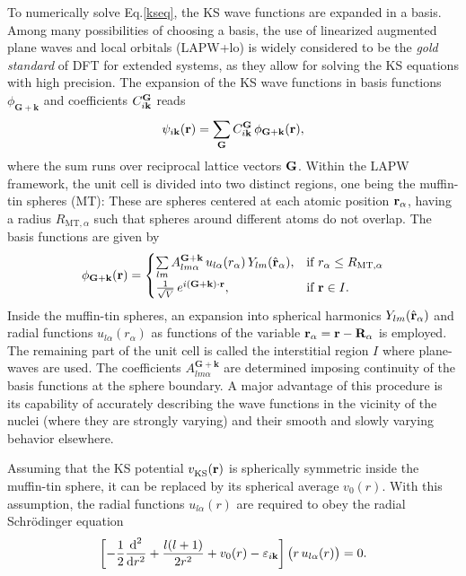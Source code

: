 To numerically solve Eq.\;\eqref{kseq}, the KS wave functions are expanded in a basis. Among many possibilities of choosing a basis, the use of linearized augmented plane waves and local orbitals (LAPW+lo) is widely considered to be the \textit{gold standard} of DFT for extended systems, as they allow for solving the KS equations  with high precision\cite{exciting}.  The expansion of the KS wave functions in basis functions $\phi_\mathbf{G+k}$ and coefficients $C^{\mathbf{G}}_{i\mathbf{k}}$  reads
 \begin{align}
    \psi_{i\mathbf{k}}(\mathbf{r}) = \sum_{\mathbf{G}} C^{\mathbf{G}}_{i\mathbf{k}}\,\phi_\mathbf{G+k}(\mathbf{r}),
\end{align}
%
where the sum runs over reciprocal lattice vectors $\mathbf{G}$.  Within the LAPW framework, the unit cell is divided into two distinct regions, one being the muffin-tin spheres (MT): These are spheres centered at each atomic position $\mathbf{r}_\alpha$, having a radius $R_{\text{MT},\alpha}$ such that spheres around different atoms do not overlap.  The basis functions are given by
 \begin{align}\label{basis}
     \phi_\mathbf{G+k}(\mathbf{r}) = \begin{cases}
      \sum\limits_{lm}A^{\mathbf{G+k}}_{lm\alpha}\,u_{l\alpha}(r_\alpha)\,Y_{lm}(\hat{\mathbf{r}}_\alpha), & \text{if } r_\alpha \leq R_{\text{MT},\alpha} \\
      \frac{1}{\sqrt{V}}\,e^{i(\mathbf{G+k})\cdot\mathbf{r}}, & \text{if }  \mathbf{r} \in I.
    \end{cases}
 \end{align}
 Inside the muffin-tin spheres, an expansion into spherical harmonics  $Y_{lm}(\hat{\mathbf{r}}_\alpha)$ and radial functions  $u_{l\alpha}(r_\alpha)$ as functions of the variable $\mathbf{r}_\alpha = \mathbf{r-R_\alpha}$ is employed.  The remaining part of the unit cell is called the interstitial region $I$ where plane-waves are used.
The coefficients  $A^{\mathbf{G+k}}_{lm\alpha}$ are determined imposing continuity of the basis functions at the sphere boundary. A major advantage of this procedure is its capability of accurately describing the wave functions in the vicinity of the nuclei (where they are strongly varying) and their smooth and slowly varying behavior elsewhere.\par
Assuming that the KS potential  $v_\text{KS}^{\phantom{I}}(\mathbf{r})$ is spherically symmetric inside the muffin-tin sphere, it can be replaced by its spherical average $v_0(r)$. With this assumption, the radial functions $u_{l\alpha}(r)$ are required to obey the radial Schr\"odinger equation
 \begin{align}\label{radfunc}
     \left[ -\frac{1}{2}\frac{\text{d}^2}{\text{d}r^2} + \frac{l(l+1)}{2r^2} + v_0(r) - \varepsilon_{i\mathbf{k}}\right]\bigl(r\,u_{l\alpha}(r)\bigr) = 0.
 \end{align}
